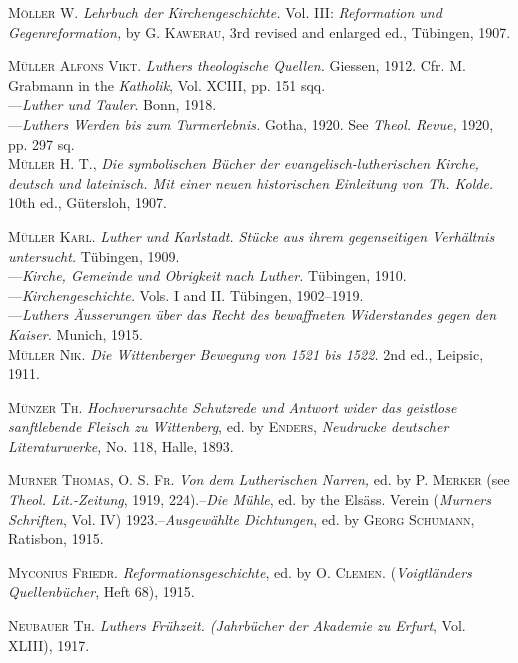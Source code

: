 \textsc{Möller W.} \textit{Lehrbuch der Kirchengeschichte.} Vol. III: \textit{Reformation und
Gegenreformation,} by \textsc{G. Kawerau}, 3rd revised and enlarged ed.,
Tübingen, 1907.

\textsc{Müller Alfons Vikt.} \textit{Luthers theologische Quellen.} Giessen, 1912. Cfr.
M. Grabmann in the \textit{Katholik}, Vol. XCIII, pp. 151 sqq. \\
---\textit{Luther und Tauler}. Bonn, 1918. \\
---\textit{Luthers Werden bis zum Turmerlebnis.} Gotha, 1920. See \textit{Theol. Revue,}
1920, pp. 297 sq. \\

\textsc{Müller H. T.}, \textit{Die symbolischen Bücher der evangelisch-lutherischen Kirche,
deutsch und lateinisch. Mit einer neuen historischen Einleitung von Th.
Kolde.} 10th ed., Gütersloh, 1907.

\textsc{Müller Karl.} \textit{Luther und Karlstadt. Stücke aus ihrem gegenseitigen Verhältnis
untersucht.} Tübingen, 1909. \\
---\textit{Kirche, Gemeinde und Obrigkeit nach Luther.} Tübingen, 1910. \\
---\textit{Kirchengeschichte.} Vols. I and II. Tübingen, 1902--1919. \\
---\textit{Luthers Äusserungen über das Recht des bewaffneten Widerstandes
gegen den Kaiser.} Munich, 1915. \\

\textsc{Müller Nik.} \textit{Die Wittenberger Bewegung von 1521 bis 1522.} 2nd ed.,
Leipsic, 1911.

\textsc{Münzer Th.} \textit{Hochverursachte Schutzrede und Antwort wider das geistlose
sanftlebende Fleisch zu Wittenberg}, ed. by \textsc{Enders}, \textit{Neudrucke deutscher
Literaturwerke,} No. 118, Halle, 1893.

\textsc{Murner Thomas, O. S. Fr.} \textit{Von dem Lutherischen Narren,} ed. by \textsc{P. Merker}
(see \textit{Theol. Lit.-Zeitung}, 1919, 224).--\textit{Die Mühle}, ed. by the Elsäss. Verein
(\textit{Murners Schriften}, Vol. IV) 1923.--\textit{Ausgewählte Dichtungen}, ed. by
\textsc{Georg Schumann}, Ratisbon, 1915.

\textsc{Myconius Friedr.} \textit{Reformationsgeschichte}, ed. by \textsc{O. Clemen.} (\textit{Voigtländers
Quellenbücher}, Heft 68), 1915.

\textsc{Neubauer Th.} \textit{Luthers Frühzeit. (Jahrbücher der Akademie zu Erfurt}, Vol.
XLIII), 1917.

